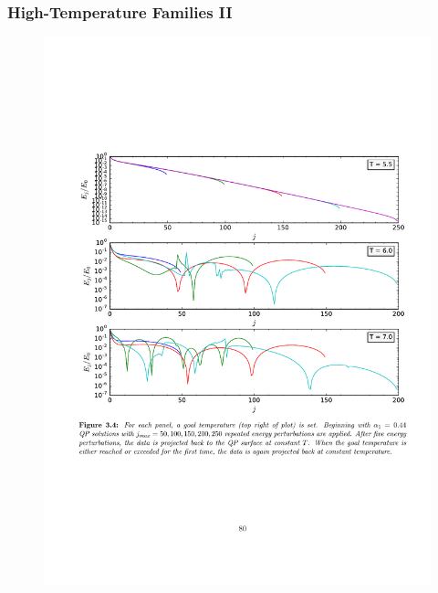 \documentclass[mathserif,10pt]{beamer}
\begin{document}
{\frame
{
  \frametitle{High-Temperature Families II}
   \begin{figure}
    \centering
    \includegraphics[scale=0.53]{constantTproj}
  \end{figure}
}

}
\end{document}
